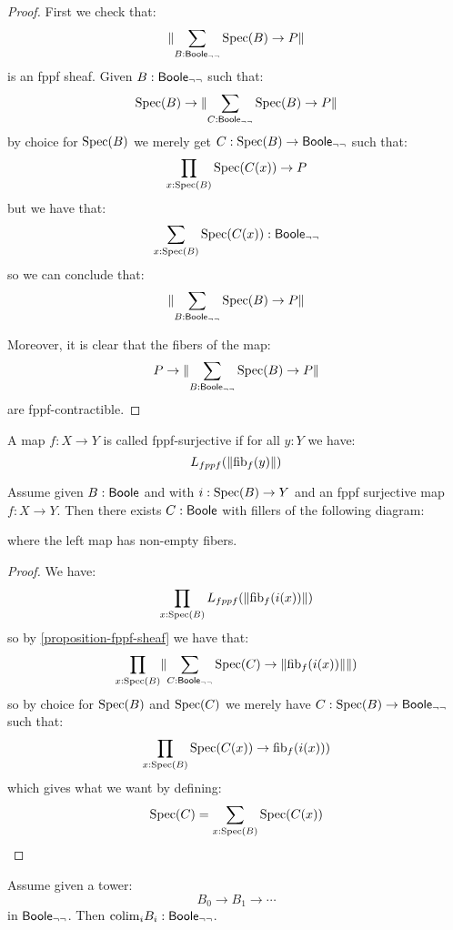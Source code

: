 \begin{proof}
First we check that: 
\[\lVert \sum_{B:\mathsf{Boole}_{\neg\neg}}\operatorname{Spec}(B)\to P \rVert\]
is an fppf sheaf. Given $B:\mathsf{Boole}_{\neg\neg}$ such that:
\[\operatorname{Spec}(B)\to \lVert \sum_{C:\mathsf{Boole}_{\neg\neg}}\operatorname{Spec}(B)\to P \rVert\]
by choice for $\operatorname{Spec}(B)$ we merely get $C:\operatorname{Spec}(B)\to \mathsf{Boole}_{\neg\neg}$ such that:
\[\prod_{x:\operatorname{Spec}(B)}\operatorname{Spec}(C(x))\to P\]
but we have that:
\[\sum_{x:\operatorname{Spec}(B)}\operatorname{Spec}(C(x)):\mathsf{Boole}_{\neg\neg}\]
so we can conclude that:
\[\lVert \sum_{B:\mathsf{Boole}_{\neg\neg}}\operatorname{Spec}(B)\to P \rVert\]

Moreover, it is clear that the fibers of the map:
\[P\to \lVert \sum_{B:\mathsf{Boole}_{\neg\neg}}\operatorname{Spec}(B)\to P \rVert\] 
are fppf-contractible.
\end{proof}

\begin{definition}
A map $f:X\to Y$ is called fppf-surjective if for all $y:Y$ we have: 
\[L_{fppf}(\lVert \mathrm{fib}_f(y) \rVert)\]
\end{definition}

\begin{lemma}\label{fppf-local-choice}
Assume given $B:\mathsf{Boole}$ and with $i:\operatorname{Spec}(B)\to Y$ and an fppf surjective map $f:X\to Y$. Then there exists $C:\mathsf{Boole}$ with fillers of the following diagram:
\begin{center}
\end{center}
where the left map has non-empty fibers.
\end{lemma}

\begin{proof}
We have:
\[\prod_{x:\operatorname{Spec}(B)} L_{fppf}(\lVert \mathrm{fib}_f(i(x)) \rVert)\]
so by \cref{proposition-fppf-sheaf} we have that:
\[\prod_{x:\operatorname{Spec}(B)} \lVert \sum_{C:\mathsf{Boole}_{\neg\neg}} \operatorname{Spec}(C)\to \lVert \mathrm{fib}_f(i(x)) \rVert \rVert)\]
so by choice for $\operatorname{Spec}(B)$ and $\operatorname{Spec}(C)$ we merely have $C:\operatorname{Spec}(B)\to \mathsf{Boole}_{\neg\neg}$ such that:
\[\prod_{x:\operatorname{Spec}(B)} \operatorname{Spec}(C(x))\to \mathrm{fib}_f(i(x)))\]
which gives what we want by defining:
\[\operatorname{Spec}(C) = \sum_{x:\operatorname{Spec}(B)}\operatorname{Spec}(C(x))\]
\end{proof}

\begin{lemma}\label{colimit-fppf}
Assume given a tower:
\[B_0\to B_1\to \cdots\]
in $\mathsf{Boole}_{\neg\neg}$. Then $\mathrm{colim}_i B_i : \mathsf{Boole}_{\neg\neg}$.
\end{lemma}

